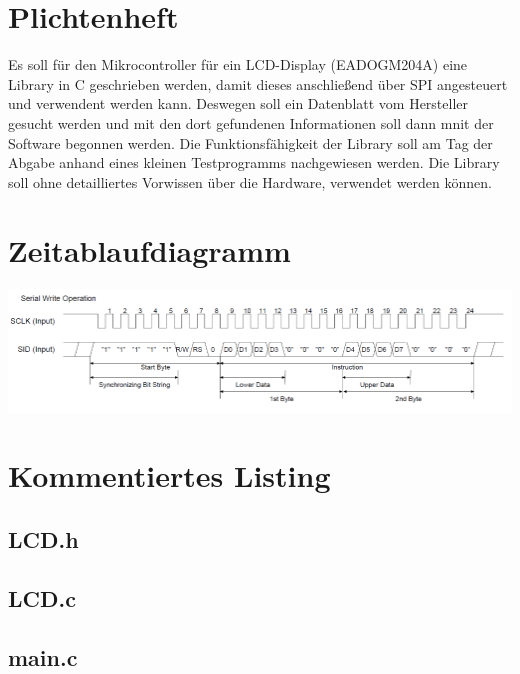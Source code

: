 \setcounter{section}{2} \setcounter{page}{2}



\section{Plichtenheft}
	Es soll für den Mikrocontroller für ein LCD-Display (EADOGM204A) eine Library in C geschrieben werden, damit
	dieses anschließend über SPI angesteuert und verwendent werden kann. Deswegen soll ein Datenblatt vom Hersteller gesucht werden 
	und mit den dort gefundenen Informationen soll dann mnit der Software begonnen werden. Die Funktionsfähigkeit der Library soll 
	am Tag der Abgabe anhand eines kleinen Testprogramms nachgewiesen werden. Die Library soll ohne detailliertes Vorwissen
	über die Hardware, verwendet werden können.

\section{Zeitablaufdiagramm}
	\includegraphics[width=\textwidth]{res/img/Zeitablaufdiagramm.PNG}
	
\section{Kommentiertes Listing}
	\UseRawInputEncoding
	\subsection{LCD.h}
		{\scriptsize}
	\subsection{LCD.c}
		{\scriptsize}
	\subsection{main.c}
		{\scriptsize}
	
